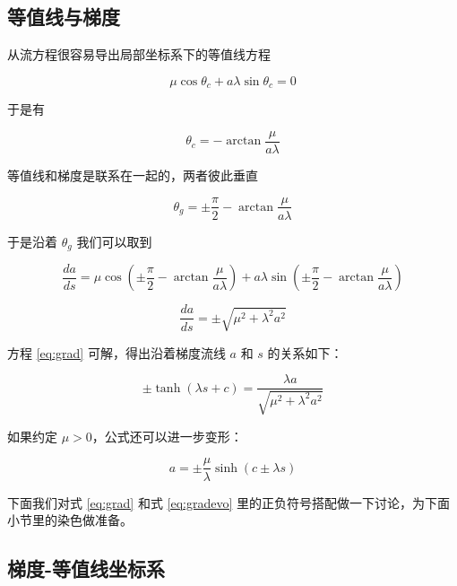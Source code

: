\documentclass[a4paper,12pt]{article}
\numberwithin{definition}{section}
\numberwithin{lemma}{section}
\numberwithin{proposition}{section}
\numberwithin{theorem}{section}
\numberwithin{grammar}{section}
\numberwithin{program}{section}
\numberwithin{convention}{section}
\numberwithin{corollary}{section}
\begin{document}
\subsection{等值线与梯度}

从流方程很容易导出局部坐标系下的等值线方程

\begin{equation}
    \mu \cos \theta_c + a \lambda \sin \theta_c = 0
\end{equation}

于是有

\begin{equation}
    \theta_c = - \arctan \frac{\mu}{a \lambda}
\end{equation}

等值线和梯度是联系在一起的，两者彼此垂直

\begin{equation}
    \theta_g = \pm \frac{\pi}{2} - \arctan \frac{\mu}{a \lambda}
\end{equation}

于是沿着 $\theta_g$ 我们可以取到

\begin{equation}
    \frac{da}{ds} = \mu \cos (\pm \frac{\pi}{2} - \arctan \frac{\mu}{a \lambda}) + a \lambda \sin (\pm \frac{\pi}{2} - \arctan \frac{\mu}{a \lambda})
\end{equation}

\begin{equation}
    \frac{da}{ds} = \pm \sqrt{\mu^2 + \lambda^2 a^2}\label{eq:grad}
\end{equation}

方程 \eqref{eq:grad} 可解，得出沿着梯度流线 $a$ 和 $s$ 的关系如下：

\begin{equation}
    \pm \tanh(\lambda s + c) = \frac{\lambda a}{\sqrt{\mu^2 + \lambda^2 a^2}}
\end{equation}

如果约定 $\mu > 0$，公式还可以进一步变形：

\begin{equation}
  a = \pm \frac{\mu}{\lambda} \sinh(c \pm \lambda s)\label{eq:gradevo}
\end{equation}

下面我们对式 \ref{eq:grad} 和式 \ref{eq:gradevo} 里的正负符号搭配做一下讨论，为下面小节里的染色做准备。

\subsection{梯度-等值线坐标系}
\end{document}
